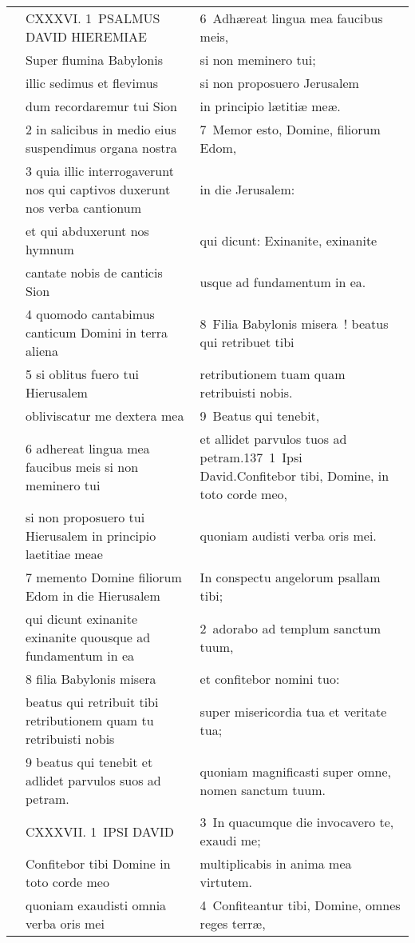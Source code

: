 \documentclass{article}
\begin{document}
\begin{longtable}{@{}p{}p{}p{}@{}}
	&	CXXXVI. 1 PSALMUS DAVID HIEREMIAE	&	6 Adhæreat lingua mea faucibus meis,	\\
	&	Super flumina Babylonis	&	si non meminero tui;	\\
	&	illic sedimus et flevimus	&	si non proposuero Jerusalem	\\
	&	dum recordaremur tui Sion	&	in principio lætitiæ meæ.	\\
	&	2 in salicibus in medio eius suspendimus organa nostra	&	7 Memor esto, Domine, filiorum Edom,	\\
	&	3 quia illic interrogaverunt nos qui captivos duxerunt nos verba cantionum	&	in die Jerusalem:	\\
	&	et qui abduxerunt nos hymnum	&	qui dicunt: Exinanite, exinanite	\\
	&	cantate nobis de canticis Sion	&	usque ad fundamentum in ea.	\\
	&	4 quomodo cantabimus canticum Domini in terra aliena	&	8 Filia Babylonis misera ! beatus qui retribuet tibi	\\
	&	5 si oblitus fuero tui Hierusalem	&	retributionem tuam quam retribuisti nobis.	\\
	&	obliviscatur me dextera mea	&	9 Beatus qui tenebit,	\\
	&	6 adhereat lingua mea faucibus meis si non meminero tui	&	et allidet parvulos tuos ad petram.137 1 Ipsi David.Confitebor tibi, Domine, in toto corde meo,	\\
	&	si non proposuero tui Hierusalem in principio laetitiae meae	&	quoniam audisti verba oris mei.	\\
	&	7 memento Domine filiorum Edom in die Hierusalem	&	In conspectu angelorum psallam tibi;	\\
	&	qui dicunt exinanite exinanite quousque ad fundamentum in ea	&	2 adorabo ad templum sanctum tuum,	\\
	&	8 filia Babylonis misera	&	et confitebor nomini tuo:	\\
	&	beatus qui retribuit tibi retributionem quam tu retribuisti nobis	&	super misericordia tua et veritate tua;	\\
	&	9 beatus qui tenebit et adlidet parvulos suos ad petram.	&	quoniam magnificasti super omne, nomen sanctum tuum.	\\
	&	CXXXVII. 1 IPSI DAVID	&	3 In quacumque die invocavero te, exaudi me;	\\
	&	Confitebor tibi Domine in toto corde meo	&	multiplicabis in anima mea virtutem.	\\
	&	quoniam exaudisti omnia verba oris mei	&	4 Confiteantur tibi, Domine, omnes reges terræ,	\\

\end{longtable}
\end{document}
